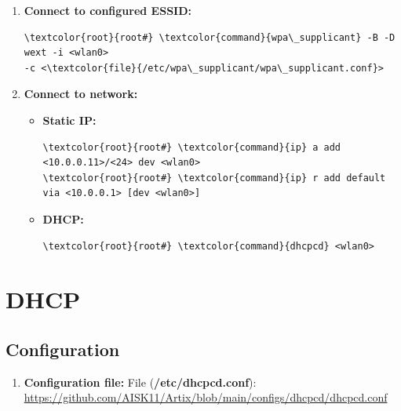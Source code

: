 \documentclass[10pt, a4paper, onecolumn, oneside, titlepage, openany]{book}
\begin{document}
\begin{enumerate}
\begin{enumerate}
        \item \textbf{Add ESSID to <\textcolor{file}{/etc/wpa\_supplicant/wpa\_supplicant.conf}>.}
    \item \textbf{Remove current wpa\_supplicant process to avoid problems:}
\begin{Verbatim}[commandchars=\\\{\}]
\textcolor{user}{user\$} \textcolor{command}{ps} -ef | \textcolor{command}{grep} '<wlan0>' | \textcolor{command}{grep} 'wpa_supplicant'
\textcolor{root}{root#} \textcolor{command}{kill} -9 <PID>
\textcolor{root}{root#} \textcolor{command}{rm} -f <\textcolor{file}{/run/wpa_supplicant/<wlan0>}>
\end{Verbatim}
    \end{enumerate}
    \item \textbf{Connect to configured ESSID:}
\begin{Verbatim}[commandchars=\\\{\}]
\textcolor{root}{root#} \textcolor{command}{wpa\_supplicant} -B -D wext -i <wlan0>
-c <\textcolor{file}{/etc/wpa\_supplicant/wpa\_supplicant.conf}>
\end{Verbatim}
    \item \textbf{Connect to network:}
    \begin{itemize}
        \item \textbf{Static IP:}
\begin{Verbatim}[commandchars=\\\{\}]
\textcolor{root}{root#} \textcolor{command}{ip} a add <10.0.0.11>/<24> dev <wlan0>
\textcolor{root}{root#} \textcolor{command}{ip} r add default via <10.0.0.1> [dev <wlan0>]
\end{Verbatim}
        \item \textbf{DHCP:}
\begin{Verbatim}[commandchars=\\\{\}]
\textcolor{root}{root#} \textcolor{command}{dhcpcd} <wlan0>
\end{Verbatim}
    \end{itemize}
\end{enumerate}

\section{DHCP}
\subsection{Configuration}
\begin{enumerate}
    \item \textbf{Configuration file:}
\newline File (\textbf{\textcolor{file}{/etc/dhcpcd.conf}}):
\newline \url{https://github.com/AISK11/Artix/blob/main/configs/dhcpcd/dhcpcd.conf}
\end{enumerate}
\end{document}
